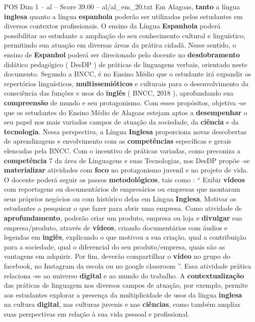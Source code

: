 \begin{textsample}{POS Dim 1 – al – Score 39.00 – al/al\_em\_20.txt}
Em Alagoas, \textbf{tanto} a língua \textbf{inglesa} quanto a língua \textbf{espanhola} poderão ser utilizadas pelos estudantes em diversos contextos profissionais.
O ensino da Língua \textbf{Espanhola} poderá possibilitar ao estudante a ampliação do seu conhecimento cultural e linguístico, permitindo sua atuação em diversas áreas da prática cidadã.
Nesse sentido, o ensino de \textbf{Espanhol} poderá ser direcionado pelo docente no \textbf{desdobramento} didático pedagógico ( DesDP ) de práticas de linguagens verbais, orientado neste documento.
Segundo a BNCC, é no Ensino Médio que o estudante irá expandir os repertórios linguísticos, \textbf{multissemióticos} e culturais para o desenvolvimento da consciência das funções e usos do \textbf{inglês} ( BNCC, 2018 ), aprofundando sua \textbf{compreensão} de mundo e seu protagonismo.
Com esses propósitos, objetiva -se que os estudantes do Ensino Médio de Alagoas estejam aptos a \textbf{desempenhar} o seu papel nos mais variados campos de atuação da sociedade, da \textbf{ciência} e da \textbf{tecnologia}.
Nessa perspectiva, a Língua \textbf{Inglesa} proporciona novas descobertas de aprendizagens e envolvimento com as \textbf{competências} específicas e gerais elencadas pela BNCC.
Com o incentivo de práticas variadas, como preconiza a \textbf{competência} 7 da área de Linguagens e suas Tecnologias, nos DesDP propõe -se \textbf{materializar} atividades com \textbf{foco} no protagonismo juvenil e no projeto de vida.
O docente poderá seguir os passos \textbf{metodológicos}, tais como : “ Exibir \textbf{vídeos} com reportagens ou documentários de empresários ou empresas que montaram seus próprios negócios ou com histórico delas em Língua \textbf{Inglesa}.
Motivar os estudantes a pesquisar o que fazer para abrir uma empresa.
Como atividade de \textbf{aprofundamento}, poderão criar um produto, empresa ou loja e \textbf{divulgar} sua empresa/produto, através de \textbf{vídeos}, criando documentários com áudios e legendas em \textbf{inglês}, explicando o que motivou a sua criação, qual a contribuição para a sociedade, qual o diferencial do seu produto/empresa, quais são as vantagens em adquirir.
Por fim, deverão compartilhar o \textbf{vídeo} no grupo do facebook, no Instagram da escola ou no google classroom ”.
Essa atividade prática relaciona -se ao universo \textbf{digital} e ao mundo do trabalho.
A \textbf{contextualização} das práticas de linguagem nos diversos campos de atuação, por exemplo, permite aos estudantes explorar a presença da multiplicidade de usos da língua \textbf{inglesa} na cultura \textbf{digital}, nas culturas juvenis e nas \textbf{ciências}, como também ampliar suas perspectivas em relação à sua vida pessoal e profissional.

\end{textsample}
